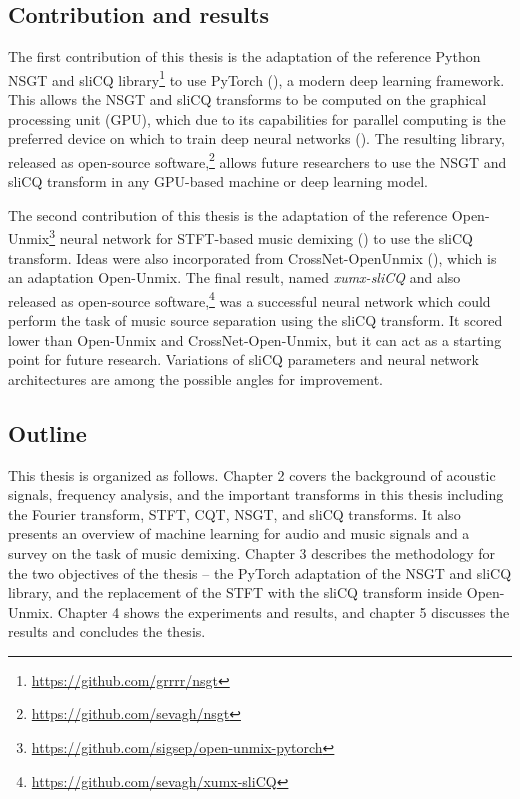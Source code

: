 \documentclass[report.tex]{subfiles}
\begin{document}
\subsection{Contribution and results}

The first contribution of this thesis is the adaptation of the reference Python NSGT and sliCQ library\footnote{\url{https://github.com/grrrr/nsgt}} to use PyTorch (\cite{pytorch}), a modern deep learning framework. This allows the NSGT and sliCQ transforms to be computed on the graphical processing unit (GPU), which due to its capabilities for parallel computing is the preferred device on which to train deep neural networks (\cite{pytorch}). The resulting library, released as open-source software,\footnote{\url{https://github.com/sevagh/nsgt}} allows future researchers to use the NSGT and sliCQ transform in any GPU-based machine or deep learning model.

The second contribution of this thesis is the adaptation of the reference Open-Unmix\footnote{\url{https://github.com/sigsep/open-unmix-pytorch}} neural network for STFT-based music demixing (\cite{umx}) to use the sliCQ transform. Ideas were also incorporated from CrossNet-OpenUnmix (\cite{xumx}), which is an adaptation Open-Unmix. The final result, named \textit{xumx-sliCQ} and also released as open-source software,\footnote{\url{https://github.com/sevagh/xumx-sliCQ}} was a successful neural network which could perform the task of music source separation using the sliCQ transform. It scored lower than Open-Unmix and CrossNet-Open-Unmix, but it can act as a starting point for future research. Variations of sliCQ parameters and neural network architectures are among the possible angles for improvement.

\subsection{Outline}

This thesis is organized as follows. Chapter 2 covers the background of acoustic signals, frequency analysis, and the important transforms in this thesis including the Fourier transform, STFT, CQT, NSGT, and sliCQ transforms. It also presents an overview of machine learning for audio and music signals and a survey on the task of music demixing. Chapter 3 describes the methodology for the two objectives of the thesis -- the PyTorch adaptation of the NSGT and sliCQ library, and the replacement of the STFT with the sliCQ transform inside Open-Unmix. Chapter 4 shows the experiments and results, and chapter 5 discusses the results and concludes the thesis.
\end{document}
